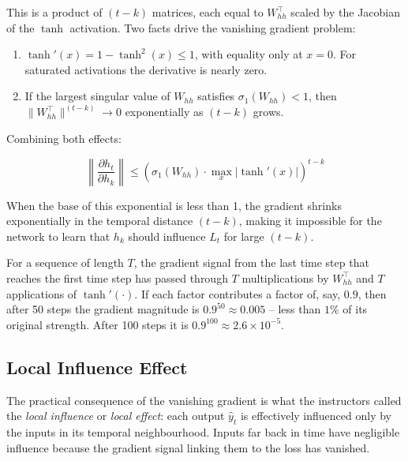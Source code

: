 \documentclass[12pt,a4paper]{article}
\newcommand{\Whh}{W_{hh}}
\begin{document}
This is a product of $(t - k)$ matrices, each equal to $\Whh^{\top}$ scaled by
the Jacobian of the $\tanh$ activation.  Two facts drive the vanishing gradient
problem:

\begin{enumerate}[label=\arabic*.]
  \item $\tanh'(x) = 1 - \tanh^2(x) \leq 1$, with equality only at $x = 0$.
        For saturated activations the derivative is nearly zero.
  \item If the largest singular value of $\Whh$ satisfies $\sigma_1(\Whh) < 1$,
        then $\|\Whh^{\top}\|^{(t-k)} \to 0$ exponentially as $(t-k)$ grows.
\end{enumerate}

Combining both effects:

\begin{equation}
  \left\|\frac{\partial h_t}{\partial h_k}\right\| \leq
  \left(\sigma_1(\Whh)\cdot \max_x |\tanh'(x)|\right)^{t-k}
  \label{eq:vanishing_bound}
\end{equation}

When the base of this exponential is less than 1, the gradient shrinks
exponentially in the temporal distance $(t-k)$, making it impossible for the
network to learn that $h_k$ should influence $L_t$ for large $(t-k)$.

\begin{keyinsight}[title=Exponential Gradient Decay]
For a sequence of length $T$, the gradient signal from the last time step that
reaches the first time step has passed through $T$ multiplications by
$\Whh^{\top}$ and $T$ applications of $\tanh'(\cdot)$.  If each factor
contributes a factor of, say, $0.9$, then after 50 steps the gradient magnitude
is $0.9^{50} \approx 0.005$ -- less than $1\%$ of its original strength.  After
100 steps it is $0.9^{100} \approx 2.6 \times 10^{-5}$.
\end{keyinsight}

\subsection{Local Influence Effect}
\label{subsec:local_influence}

The practical consequence of the vanishing gradient is what the instructors
called the \emph{local influence} or \emph{local effect}: each output $\hat{y}_t$
is effectively influenced only by the inputs in its temporal neighbourhood.
Inputs far back in time have negligible influence because the gradient signal
linking them to the loss has vanished.
\end{document}
